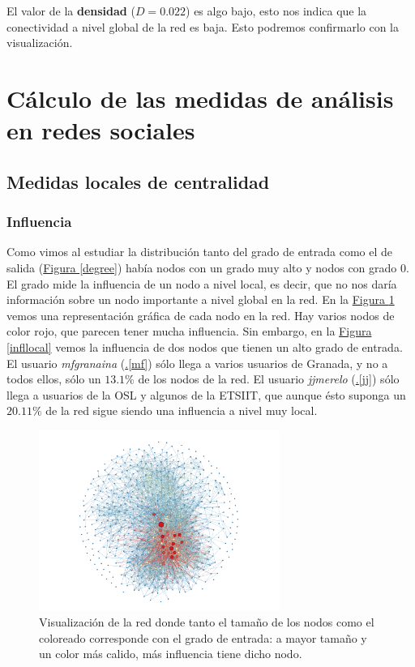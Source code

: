 \documentclass[10pt,a4paper,spanish]{article}
\numberwithin{equation}{section} %
\numberwithin{figure}{section} %
\numberwithin{table}{section} %
\begin{document}
El valor de la \textbf{densidad} ($D = 0.022$) es algo bajo, esto nos indica que la conectividad a nivel global de la red es baja. Esto podremos confirmarlo con la visualización.

\section{Cálculo de las medidas de análisis en redes sociales}

\subsection{Medidas locales de centralidad}

\subsubsection{Influencia}
Como vimos al estudiar la distribución tanto del grado de entrada como el de salida (\hyperref[degree]{Figura \ref*{degree}}) había nodos con un grado muy alto y nodos con grado 0. El grado mide la influencia de un nodo a nivel local, es decir, que no nos daría información sobre un nodo importante a nivel global en la red. En la \hyperref[influencia]{Figura \ref*{influencia}} vemos una representación gráfica de cada nodo en la red. Hay varios nodos de color rojo, que parecen tener mucha influencia. Sin embargo, en la \hyperref[infllocal]{Figura \ref*{infllocal}} vemos la influencia de dos nodos que tienen un alto grado de entrada. El usuario \textit{mfgranaina} (\hyperref[mf]{\thesection .\ref*{mf}}) sólo llega a varios usuarios de Granada, y no a todos ellos, sólo un $13.1\%$ de los nodos de la red. El usuario \textit{jjmerelo} (\hyperref[jj]{\thesection .\ref*{jj}}) sólo llega a usuarios de la OSL y algunos de la ETSIIT, que aunque ésto suponga un $20.11\%$ de la red sigue siendo una influencia a nivel muy local.

\begin{figure}[!h]
    \centering
    \includegraphics[width=0.7\textwidth]{medidas_locales/influencia}
    \caption{Visualización de la red donde tanto el tamaño de los nodos como el coloreado corresponde con el grado de entrada: a mayor tamaño y un color más calido, más influencia tiene dicho nodo.}
    \label{influencia}
\end{figure}
\end{document}
